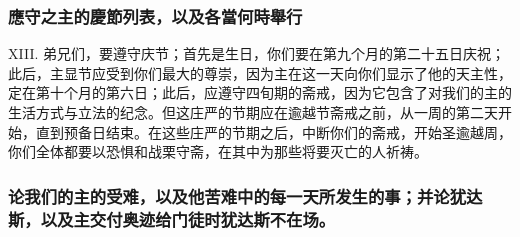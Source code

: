
\subsubsection{應守之主的慶節列表，以及各當何時舉行}

XIII. 弟兄们，要遵守庆节；首先是生日，你们要在第九个月的第二十五日庆祝；此后，主显节应受到你们最大的尊崇，因为主在这一天向你们显示了他的天主性，定在第十个月的第六日；此后，应遵守四旬期的斋戒，因为它包含了对我们的主的生活方式与立法的纪念。但这庄严的节期应在逾越节斋戒之前，从一周的第二天开始，直到预备日结束。在这些庄严的节期之后，中断你们的斋戒，开始圣逾越周，你们全体都要以恐惧和战栗守斋，在其中为那些将要灭亡的人祈祷。\par


\subsubsection{论我们的主的受难，以及他苦难中的每一天所发生的事；并论犹达斯，以及主交付奥迹给门徒时犹达斯不在场。}

